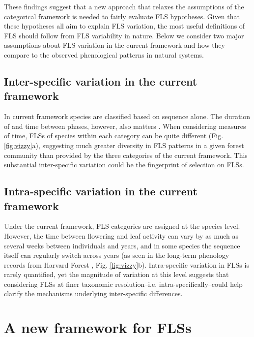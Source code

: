 \documentclass{article}
\begin{document}
\noindent These findings suggest that a new approach that relaxes the assumptions of the categorical framework is needed to fairly evaluate FLS hypotheses. Given that these hypotheses all aim to explain FLS variation, the most useful definitions of FLS should follow from FLS variability in nature. Below we consider two major assumptions about FLS variation in the current framework and how they compare to the observed phenological patterns in natural systems.\\


\subsection*{Inter-specific variation in the current framework}
\noindent In current framework species are classified based on sequence alone. The duration of and time between phases, however, also matters \citep{Inouye2019}. When considering measures of time, FLSs of species within each category can be quite different (Fig. \ref{fig:vizzy}a), suggesting much greater diversity in FLS patterns in a given forest community than provided by the three categories of the current framework. This substantial inter-specific variation could be the fingerprint of selection on FLSs.\\ %

\subsection*{Intra-specific variation in the current framework}
\noindent Under the current framework, FLS categories are assigned at the species level. However, the time between flowering and leaf activity can vary by as much as several weeks between individuals and years, and in some species the sequence itself can regularly switch across years (as seen in the long-term phenology records from  Harvard Forest \citep{OKeefe2015}, Fig. \ref{fig:vizzy}b). Intra-specific variation in FLSs is rarely quantified, yet the magnitude of variation at this level suggests that considering FLSs at finer taxonomic resolution--i.e. intra-specifically--could help clarify the mechanisms underlying inter-specific differences.\\

\section*{A new framework for FLSs} %
\end{document}
